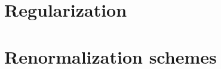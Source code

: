 
\section{Regularization}
\label{sec:regularization}

\section{Renormalization schemes}
\label{sec:renorm-schem}

